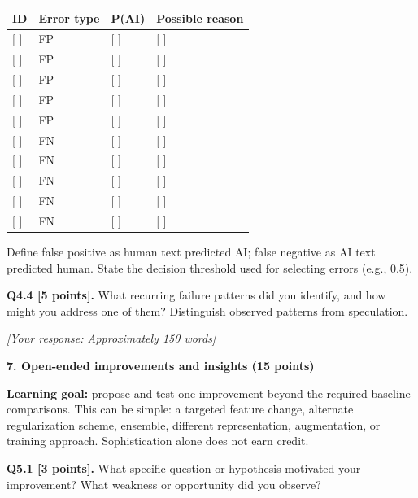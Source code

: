 \documentclass[11pt,letterpaper]{article}
\begin{document}
\vspace{2pt}
\begin{tabularx}{\textwidth}{@{}llp{2.0cm}X@{}}
\toprule
\textbf{ID} & \textbf{Error type} & \textbf{P(AI)} & \textbf{Possible reason} \\
\midrule
{}[ ] & FP & [ ] & [ ] \\
{}[ ] & FP & [ ] & [ ] \\
{}[ ] & FP & [ ] & [ ] \\
{}[ ] & FP & [ ] & [ ] \\
{}[ ] & FP & [ ] & [ ] \\
\midrule
{}[ ] & FN & [ ] & [ ] \\
{}[ ] & FN & [ ] & [ ] \\
{}[ ] & FN & [ ] & [ ] \\
{}[ ] & FN & [ ] & [ ] \\
{}[ ] & FN & [ ] & [ ] \\
\bottomrule
\end{tabularx}

\vspace{2pt}
{\footnotesize Define false positive as human text predicted AI; false negative as AI text predicted human. State the decision threshold used for selecting errors (e.g., 0.5).}

\vspace{6pt}
\textbf{Q4.4 [5 points].} What recurring failure patterns did you identify, and how might you address one of them? Distinguish observed patterns from speculation.

\textit{[Your response: Approximately 150 words]}

\newpage

{\large\textbf{7. Open-ended improvements and insights (15 points)}}
\vspace{2pt}

\textbf{Learning goal:} propose and test one improvement beyond the required baseline comparisons. This can be simple: a targeted feature change, alternate regularization scheme, ensemble, different representation, augmentation, or training approach. Sophistication alone does not earn credit.

\vspace{6pt}
\textbf{Q5.1 [3 points].} What specific question or hypothesis motivated your improvement? What weakness or opportunity did you observe?
\end{document}

